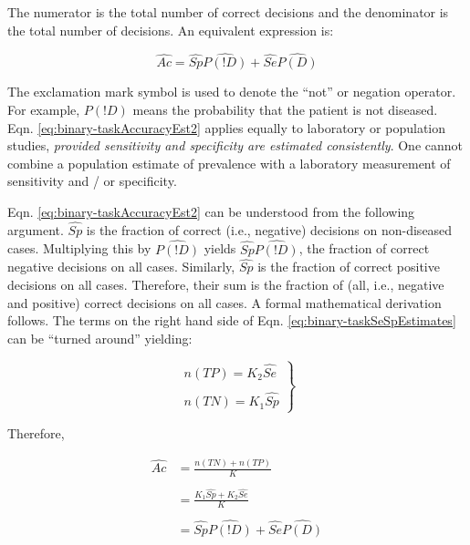 \documentclass[
]{book}
\begin{document}
The numerator is the total number of correct decisions and the denominator is the total number of decisions. An equivalent expression is:

\begin{equation} 
\widehat{Ac}=\widehat{Sp}\widehat{P(!D)}+\widehat{Se}\widehat{P(D)}
\label{eq:binary-taskAccuracyEst2}
\end{equation}

The exclamation mark symbol is used to denote the ``not'' or negation operator. For example, \(P(!D)\) means the probability that the patient is not diseased. Eqn. \eqref{eq:binary-taskAccuracyEst2} applies equally to laboratory or population studies, \emph{provided sensitivity and specificity are estimated consistently}. One cannot combine a population estimate of prevalence with a laboratory measurement of sensitivity and / or specificity.

Eqn. \eqref{eq:binary-taskAccuracyEst2} can be understood from the following argument. \(\widehat{Sp}\) is the fraction of correct (i.e., negative) decisions on non-diseased cases. Multiplying this by \(\widehat{P(!D)}\) yields \(\widehat{Sp} \widehat{P(!D)}\), the fraction of correct negative decisions on all cases. Similarly, \(\widehat{Sp}\) is the fraction of correct positive decisions on all cases. Therefore, their sum is the fraction of (all, i.e., negative and positive) correct decisions on all cases. A formal mathematical derivation follows. The terms on the right hand side of Eqn. \eqref{eq:binary-taskSeSpEstimates} can be ``turned around'' yielding:

\begin{equation} 
\left.\begin{matrix}
n(TP)=K_2 \widehat{Se}\\ 
\\
n(TN)=K_1 \widehat{Sp}
\end{matrix}\right\}
\label{eq:binary-tasknTpnTN}
\end{equation}

Therefore,

\begin{equation} 
\begin{aligned}
\widehat{Ac}&=\frac{n(TN)+n(TP)}{K}\\
\\
&=\frac{K_1 \widehat{Sp}+K_2 \widehat{Se}}{K}\\
\\
&=\widehat{Sp} \widehat{P(!D)}+\widehat{Se}\widehat{P(D)}
\end{aligned}
\label{eq:binary-taskAccuracyDeriv}
\end{equation}
\end{document}
